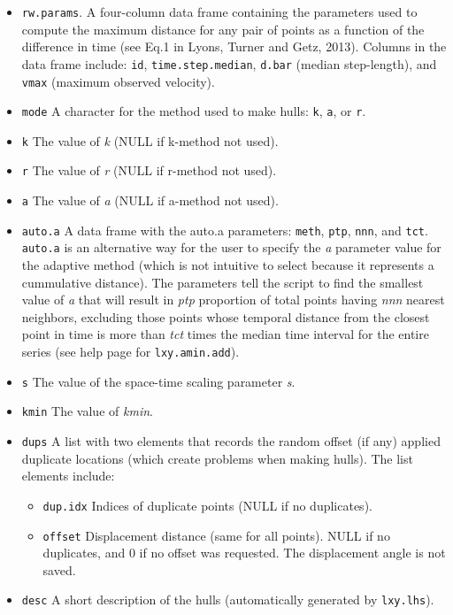 \documentclass{article}
\begin{document}
\begin{itemize}
  \item \texttt{rw.params}. A four-column data frame containing the parameters used to compute the maximum distance for any pair of points as a function of the difference in time (see Eq.1 in Lyons, Turner and Getz, 2013). Columns in the data frame include: \texttt{id}, \texttt{time.step.median}, \texttt{d.bar} (median step-length), and \texttt{vmax} (maximum observed velocity).

  \item \texttt{mode} A character for the method used to make hulls: \texttt{k}, \texttt{a}, or \texttt{r}.
  \item \texttt{k} The value of \textit{k} (NULL if k-method not used).
  \item \texttt{r} The value of \textit{r} (NULL if r-method not used).
  \item \texttt{a} The value of \textit{a} (NULL if a-method not used).
  \item \texttt{auto.a} A data frame with the auto.a parameters: \texttt{meth}, \texttt{ptp}, \texttt{nnn}, and \texttt{tct}. \texttt{auto.a} is an alternative way for the user to specify the \textit{a} parameter value for the adaptive method (which is not intuitive to select because it represents a cummulative distance). The parameters tell the script to find the smallest value of \textit{a} that will result in \textit{ptp} proportion of total points having \textit{nnn} nearest neighbors, excluding those points whose temporal distance from the closest point in time is more than \textit{tct} times the median time interval for the entire series (see help page for \texttt{lxy.amin.add}).
  \item \texttt{s} The value of the space-time scaling parameter \textit{s}. 
  \item \texttt{kmin} The value of \textit{kmin}.
  \item \texttt{dups} A list with two elements that records the random offset (if any) applied duplicate locations (which create problems when making hulls). The list elements include:
    \begin{itemize}  
      \item \texttt{dup.idx} Indices of duplicate points (NULL if no duplicates).
      \item \texttt{offset} Displacement distance (same for all points). NULL if no duplicates, and 0 if no offset was requested. The displacement angle is not saved.
    \end{itemize}
  \item \texttt {desc} A short description of the hulls (automatically generated by \texttt{lxy.lhs}).

\end{itemize}
\end{document}
